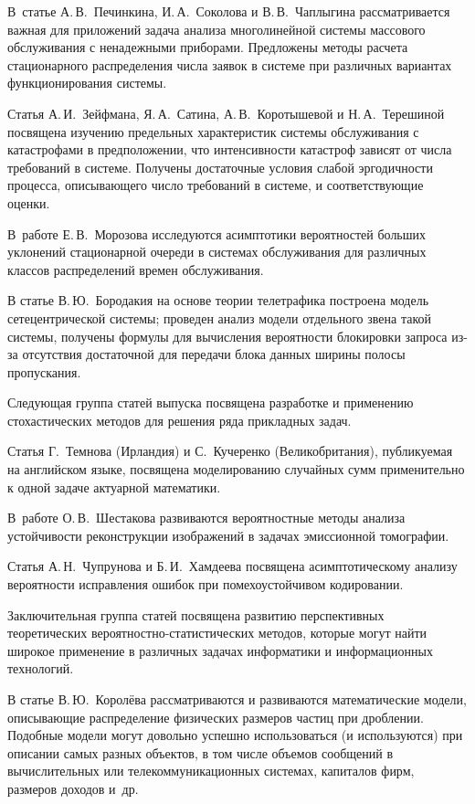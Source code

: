 {{{В~статье А.\,В.~Печинкина, И.\,А.~Соколова и В.\,В.~Чаплыгина 
рассматривается важная для приложений задача анализа многолинейной системы массового обслуживания с ненадежными 
приборами. Предложены методы расчета стационарного распределения числа заявок в системе при различных вариантах 
функционирования системы. 

Статья А.\,И.~Зейфмана, Я.\,А.~Сатина, А.\,В.~Коротышевой и Н.\,А.~Терешиной 
посвящена изучению предельных характеристик сис\-те\-мы обслуживания с катастрофами в предположении, что 
интенсивности катастроф зависят от числа требований в системе. Получены достаточные условия слабой 
эргодичности процесса, описывающего число требований в системе, и соответствующие оценки. 

В~работе Е.\,В.~Морозова исследуются асимптотики вероятностей больших уклонений стационарной 
очереди в системах обслуживания для различных классов распределений времен обслуживания. 

В статье В.\,Ю.~Бородакия на основе теории телетрафика построена модель сетецентрической системы; 
проведен анализ модели отдельного звена такой системы, получены формулы для вычисления вероятности 
блокировки запроса из-за отсутствия достаточной для передачи блока данных ширины полосы пропускания.

Следующая группа статей выпуска посвящена разработке и применению стохастических методов для решения 
ряда прикладных задач. 

Статья Г.~Темнова (Ирландия) и С.~Кучеренко (Великобритания), публикуемая на 
английском языке, посвящена моделированию случайных сумм применительно к одной задаче актуарной математики. 

В~работе О.\,В.~Шестакова развиваются вероятностные методы анализа устойчивости реконструкции изображений 
в задачах эмиссионной томографии. 

Статья А.\,Н.~Чупрунова и Б.\,И.~Хамдеева посвящена асимптотическому 
анализу вероятности ис\-прав\-ле\-ния ошибок при помехоустойчивом кодировании.

Заключительная группа статей посвящена развитию перспективных теоретических вероятностно-статистических 
методов, которые могут найти широкое применение в различных задачах информатики и информационных технологий. 

В статье В.\,Ю.~Королёва рассматриваются и развиваются математические модели, описывающие распределение 
физических размеров частиц при дроблении. Подобные модели могут довольно успешно использоваться (и используются) 
при описании самых разных объектов, в том числе объемов сообщений в вычислительных или телекоммуникационных 
системах, капиталов фирм, размеров доходов и~др. 

}}}

